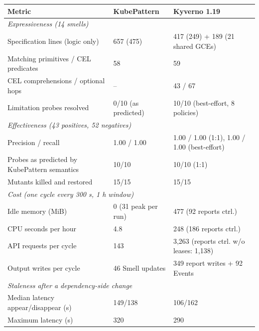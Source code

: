 \begin{tabular}{lll}
\toprule
Metric & KubePattern & Kyverno 1.19 \\
\midrule
\multicolumn{3}{l}{\emph{Expressiveness (14 smells)}} \\
Specification lines (logic only) & 657 (475) & 417 (249) + 189 (21 shared GCEs) \\
Matching primitives / CEL predicates & 58 & 59 \\
CEL comprehensions / optional hops & -- & 43 / 67 \\
Limitation probes resolved & 0/10 (as predicted) & 10/10 (best-effort, 8 policies) \\
\midrule
\multicolumn{3}{l}{\emph{Effectiveness (43 positives, 52 negatives)}} \\
Precision / recall & 1.00 / 1.00 & 1.00 / 1.00 (1:1), 1.00 / 1.00 (best-effort) \\
Probes as predicted by KubePattern semantics & 10/10 & 10/10 (1:1) \\
Mutants killed and restored & 15/15 & 15/15 \\
\midrule
\multicolumn{3}{l}{\emph{Cost (one cycle every 300 s, 1 h window)}} \\
Idle memory (MiB) & 0 (31 peak per run) & 477 (92 reports ctrl.) \\
CPU seconds per hour & 4.8 & 248 (186 reports ctrl.) \\
API requests per cycle & 143 & 3,263 (reports ctrl. w/o leases: 1,138) \\
Output writes per cycle & 46 Smell updates & 349 report writes + 92 Events \\
\midrule
\multicolumn{3}{l}{\emph{Staleness after a dependency-side change}} \\
Median latency appear/disappear (s) & 149/138 & 106/162 \\
Maximum latency (s) & 320 & 290 \\
\bottomrule
\end{tabular}
